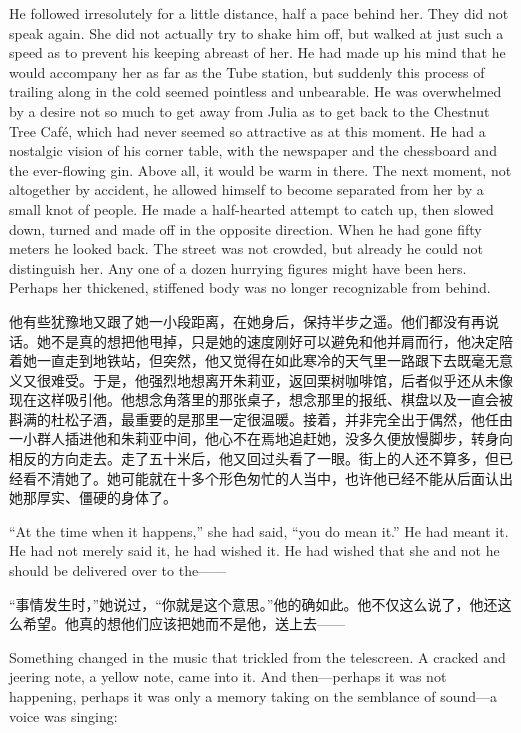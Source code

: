 \begin{paracol}{2}
He followed irresolutely for a little distance, half a pace behind her.
They did not speak again. She did not actually try to shake him off, but
walked at just such a speed as to prevent his keeping abreast of her. He
had made up his mind that he would accompany her as far as the Tube
station, but suddenly this process of trailing along in the cold seemed
pointless and unbearable. He was overwhelmed by a desire not so much to
get away from Julia as to get back to the Chestnut Tree Café, which had
never seemed so attractive as at this moment. He had a nostalgic vision
of his corner table, with the newspaper and the chessboard and the
ever-flowing gin. Above all, it would be warm in there. The next moment,
not altogether by accident, he allowed himself to become separated from
her by a small knot of people. He made a half-hearted attempt to catch
up, then slowed down, turned and made off in the opposite direction.
When he had gone fifty meters he looked back. The street was not
crowded, but already he could not distinguish her. Any one of a dozen
hurrying figures might have been hers. Perhaps her thickened, stiffened
body was no longer recognizable from behind.

\switchcolumn

他有些犹豫地又跟了她一小段距离，在她身后，保持半步之遥。他们都没有再说话。她不是真的想把他甩掉，只是她的速度刚好可以避免和他并肩而行，他决定陪着她一直走到地铁站，但突然，他又觉得在如此寒冷的天气里一路跟下去既毫无意义又很难受。于是，他强烈地想离开朱莉亚，返回栗树咖啡馆，后者似乎还从未像现在这样吸引他。他想念角落里的那张桌子，想念那里的报纸、棋盘以及一直会被斟满的杜松子酒，最重要的是那里一定很温暖。接着，并非完全出于偶然，他任由一小群人插进他和朱莉亚中间，他心不在焉地追赶她，没多久便放慢脚步，转身向相反的方向走去。走了五十米后，他又回过头看了一眼。街上的人还不算多，但已经看不清她了。她可能就在十多个形色匆忙的人当中，也许他已经不能从后面认出她那厚实、僵硬的身体了。

\switchcolumn*

``At the time when it happens,'' she had said, ``you do mean it.'' He had
meant it. He had not merely said it, he had wished it. He had wished
that she and not he should be delivered over to the------

\switchcolumn

``事情发生时，''她说过，``你就是这个意思。''他的确如此。他不仅这么说了，他还这么希望。他真的想他们应该把她而不是他，送上去——

\switchcolumn*

Something changed in the music that trickled from the telescreen. A
cracked and jeering note, a yellow note, came into it. And
then---perhaps it was not happening, perhaps it was only a memory taking
on the semblance of sound---a voice was singing:


\end{paracol}
